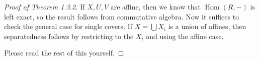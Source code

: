 \documentclass[leqno, openany]{memoir}
\theoremstyle{definition}
\theoremstyle{remark}
\theoremstyle{plain}
\theoremstyle{definition}
\theoremstyle{remark}
\DeclareMathOperator{\Hom}{Hom}
\begin{document}
\begin{proof}[Proof of Theorem 1.3.2]
    If $X,U,V$ are affine, then we know that $\Hom(R,-)$ is left exact, so the result follows from commutative algebra. Now it suffices to check the general case for single covers. If $X = \bigcup X_i$ is a union of affines, then separatedness follows by restricting to the $X_i$ and using the affine case.

    Please read the rest of this yourself.
\end{proof}
\end{document}
